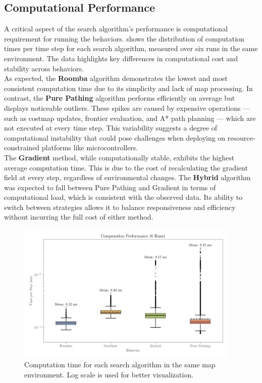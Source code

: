 \subsection{Computational Performance}
A critical aspect of the search algorithm's performance is computational requirement for running the behaviors.
 shows the distribution of computation times per time step for each search algorithm, measured over six runs in the same environment. The data highlights key differences in computational cost and stability across behaviors.\\

As expected, the \textbf{Roomba} algorithm demonstrates the lowest and most consistent computation time due to its simplicity and lack of map processing. In contrast, the \textbf{Pure Pathing} algorithm performs efficiently on average but displays noticeable outliers. These spikes are caused by expensive operations --- such as costmap updates, frontier evaluation, and A* path planning --- which are not executed at every time step. This variability suggests a degree of computational instability that could pose challenges when deploying on resource-constrained platforms like microcontrollers.\\

The \textbf{Gradient} method, while computationally stable, exhibits the highest average computation time. This is due to the cost of recalculating the gradient field at every step, regardless of environmental changes. The \textbf{Hybrid} algorithm was expected to fall between Pure Pathing and Gradient in terms of computational load, which is consistent with the observed data. Its ability to switch between strategies allows it to balance responsiveness and efficiency without incurring the full cost of either method.

\begin{figure}[H]
    \begin{center}
        \includegraphics[width=0.95\textwidth]{./figures/plots/computation-performance-(6-runs).png}
    \end{center}
    \caption{Computation time for each search algorithm in the same map environment. Log scale is used for better visualization.}
    \label{fig:computation-performance}
\end{figure}

